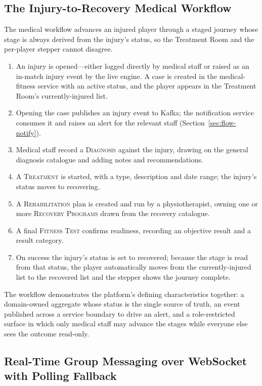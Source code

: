 \subsection{The Injury-to-Recovery Medical Workflow}
\label{sec:flow-medical}

The medical workflow advances an injured player through a staged journey whose stage is
always derived from the injury's status, so the Treatment Room and the per-player stepper
cannot disagree.

\begin{enumerate}
  \item An injury is opened---either logged directly by medical staff or raised as an
  in-match injury event by the live engine. A case is created in the medical-fitness
  service with an active status, and the player appears in the Treatment Room's
  currently-injured list.
  \item Opening the case publishes an injury event to Kafka; the notification service
  consumes it and raises an alert for the relevant staff (Section~\ref{sec:flow-notify}).
  \item Medical staff record a \textsc{Diagnosis} against the injury, drawing on the general
  diagnosis catalogue and adding notes and recommendations.
  \item A \textsc{Treatment} is started, with a type, description and date range; the
  injury's status moves to recovering.
  \item A \textsc{Rehabilitation} plan is created and run by a physiotherapist, owning one or
  more \textsc{Recovery Programs} drawn from the recovery catalogue.
  \item A final \textsc{Fitness Test} confirms readiness, recording an objective result and a
  result category.
  \item On success the injury's status is set to recovered; because the stage is read from
  that status, the player automatically moves from the currently-injured list to the
  recovered list and the stepper shows the journey complete.
\end{enumerate}

The workflow demonstrates the platform's defining characteristics together: a domain-owned
aggregate whose status is the single source of truth, an event published across a service
boundary to drive an alert, and a role-restricted surface in which only medical staff may
advance the stages while everyone else sees the outcome read-only.

\subsection{Real-Time Group Messaging over WebSocket with Polling Fallback}
\label{sec:flow-chat}


